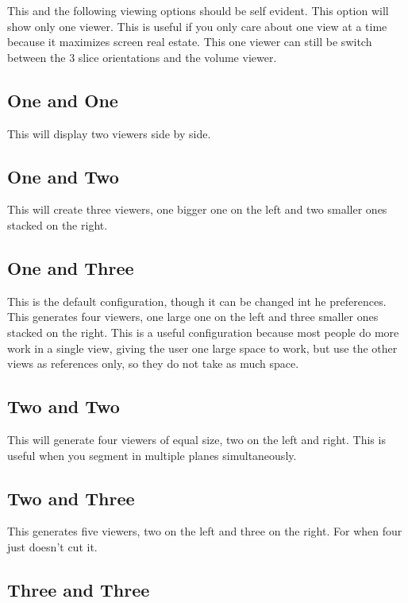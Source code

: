 \documentclass[fleqn,11pt,openany]{book}
\begin{document}
This and the following viewing options should be self evident.  This option will show only one viewer.  This is useful if you only care about one view at a time because it maximizes screen real estate.  This one viewer can still be switch between the 3 slice orientations and the volume viewer.  

\subsection{One and One}

This will display two viewers side by side.  

\subsection{One and Two}

This will create three viewers,  one bigger one on the left and two smaller ones stacked on the right.  

\subsection{One and Three}

This is the default configuration,  though it can be changed int he preferences.  This generates four viewers, one large one on the left and three smaller ones stacked on the right.  This is a useful configuration because most people do more work in a single view, giving the user one large space to work, but use the other views as references only, so they do not take as much space.

\subsection{Two and Two}

This will generate four viewers of equal size, two on the left and right.  This is useful when you segment in multiple planes simultaneously.

\subsection{Two and Three}

This generates five viewers, two on the left and three on the right.  For when four just doesn't cut it.  

\subsection{Three and Three}
\end{document}
